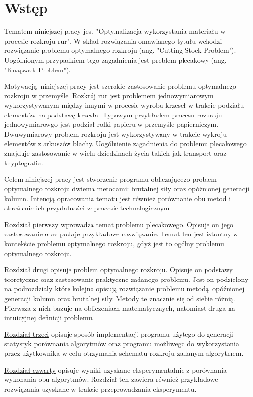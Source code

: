 \section{Wstęp}
Tematem niniejszej pracy jest "Optymalizacja wykorzystania materiału w procesie rozkroju rur". W skład rozwiązania omawianego tytułu wchodzi rozwiązanie problemu optymalnego rozkroju (ang. "Cutting Stock Problem"). Uogólnionym przypadkiem tego zagadnienia jest problem plecakowy (ang. "Knapsack Problem").

Motywacją niniejszej pracy jest szerokie zastosowanie problemu optymalnego rozkroju w przemyśle. Rozkrój rur jest problemem jednowymiarowym wykorzystywanym między innymi w procesie wyrobu krzeseł w trakcie podziału elementów na podstawę krzesła. Typowym przykładem procesu rozkroju jednowymiarowgo jest podział rolki papieru w przemyśle papierniczym. Dwuwymiarowy problem rozkroju jest wykorzystywany w trakcie wykroju elementów z arkuszów blachy. Uogólnienie zagadnienia do problemu plecakowego znajduje zastosowanie w wielu dziedzinach życia takich jak transport oraz kryptografia.

Celem niniejszej pracy jest stworzenie programu obliczającego problem optymalnego rozkroju dwiema metodami: brutalnej siły oraz opóźnionej generacji kolumn. Intencją opracowania tematu jest również porównanie obu metod i określenie ich przydatności w procesie technologicznym.

\hyperref[sec:knapsack]{Rozdział pierwszy} wprowadza temat problemu plecakowego. Opisuje on jego zastosowanie oraz podaje przykładowe rozwiązanie. Temat ten jest istontny w kontekście problemu optymalnego rozkroju, gdyż jest to ogólny problemu optymalnego rozkroju.

\hyperref[sec:cuttingStockProblem]{Rozdział drugi} opisuje problem optymalnego rozkroju. Opisuje on podstawy teoretyczne oraz zastosowanie praktyczne zadanego problemu. Jest on podzielony na podrozdziały które kolejno opisują rozwiązanie problemu metodą opóźnionej generacji kolumn oraz brutalnej siły. Metody te znacznie się od siebie różnią. Pierwsza z nich bazuje na obliczeniach matematycznych, natomiast druga na intuicyjnej definicji problemu.

\hyperref[sec:implementation]{Rozdział trzeci} opisuje sposób implementacji programu użytego do generacji statystyk porównania algorytmów oraz programu możliwego do wykorzystania przez użytkownika w celu otrzymania schematu rozkroju zadanym algorytmem.

\hyperref[sec:result]{Rozdział czwarty} opisuje wyniki uzyskane eksperymentalnie z porównania wykonania obu algorytmów. Rozdział ten zawiera również przykładowe rozwiązania uzyskane w trakcie przeprowadzania eksperymentu.
